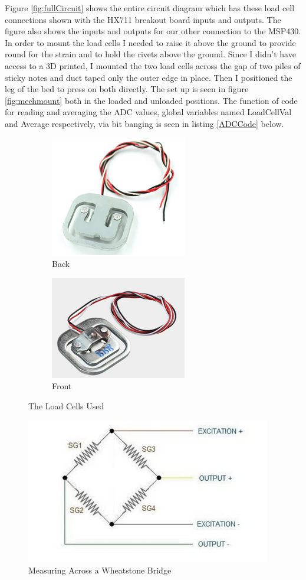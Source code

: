 \documentclass[11pt]{article}
\begin{document}
Figure \ref{fig:fullCircuit} shows the entire circuit diagram which has these load cell connections shown with the HX711 breakout board inputs and outputs.
The figure also shows the inputs and outputs for our other connection to the MSP430.
In order to mount the load cells I needed to raise it above the ground to provide round for the strain and to hold the rivets above the ground.
Since I didn't have access to a 3D printed, I mounted the two load cells across the gap of two piles of sticky notes and duct taped only the outer edge in place.
Then I positioned the leg of the bed to press on both directly.
The set up is seen in figure \ref{fig:mechmount} both in the loaded and unloaded positions.
The function of code for reading and averaging the ADC values, global variables named LoadCellVal and Average respectively, via bit banging is seen in listing \ref{ADCCode} below.    
\\
\begin{figure}[H]
	\centering
	\begin{subfigure}[]{0.4\textwidth}
		\centering
		\includegraphics{loadcellback}
		\caption{Back}
	\end{subfigure}
	\hfill
	\begin{subfigure}[]{0.4\textwidth}
		\centering
		\includegraphics{loadcellfront}
		\caption{Front}
	\end{subfigure}
	\caption{The Load Cells Used}
	\label{fig:loadcellproduct}
\end{figure}
\begin{figure}[H]
	\centering
	\includegraphics[width = 0.4\linewidth]{bridgeConnefiguration}
	\caption{Measuring Across a Wheatstone Bridge}
	\label{fig:Bridge}
\end{figure}
\end{document}
